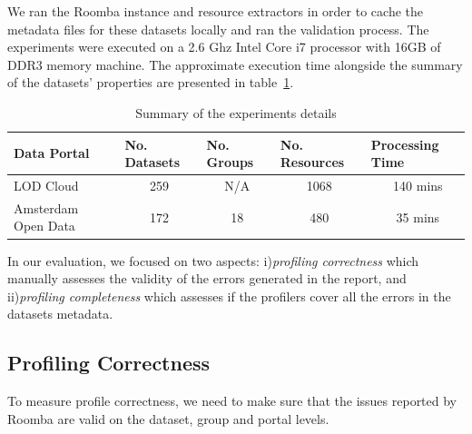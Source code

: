 \documentclass[runningheads,a4paper]{../../Util/LaTEX/llncs}
\begin{document}
We ran the Roomba instance and resource extractors in order to cache the metadata files for these datasets locally and ran the validation process. The experiments were executed on a 2.6 Ghz Intel Core i7 processor with 16GB of DDR3 memory machine. The approximate execution time alongside the summary of the datasets' properties are presented in table~\ref{tab:data_portals_experiments}.

\begin{table}[ht]
\centering
\begin{tabular}{|l|c|c|c|c|}
\hline
Data Portal         & \multicolumn{1}{l|}{No. Datasets} & \multicolumn{1}{l|}{No. Groups} & \multicolumn{1}{l|}{No. Resources} & \multicolumn{1}{l|}{Processing Time} \\ \hline
LOD Cloud           & 259                               & N/A                            & 1068                               & ~140 mins                            \\ \hline
Amsterdam Open Data & 172                               & 18                             & 480                                & ~35 mins                             \\ \hline
\end{tabular}
\caption{Summary of the experiments details}
\label{tab:data_portals_experiments}
\end{table}

In our evaluation, we focused on two aspects: i)\textit{profiling correctness} which manually assesses the validity of the errors generated in the report, and ii)\textit{profiling completeness} which assesses if the profilers cover all the errors in the datasets metadata.

\subsection{Profiling Correctness}
To measure profile correctness, we need to make sure that the issues reported by Roomba are valid on the dataset, group and portal levels.
\end{document}
